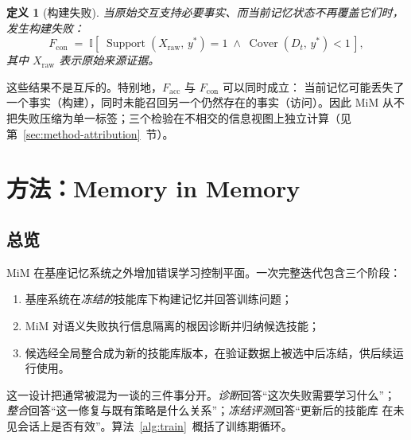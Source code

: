 \documentclass[UTF8,11pt]{ctexart}
\newtheorem{definition}{定义}[section]
\newcommand{\II}{\mathbb{I}}
\DeclareMathOperator{\Cover}{Cover}
\DeclareMathOperator{\Support}{Support}
\begin{document}
\begin{definition}[构建失败]
\label{def:con}
当原始交互支持必要事实、而当前记忆状态不再覆盖它们时，发生\emph{构建失败}：
\begin{equation}
\label{eq:fcon}
F_{\mathrm{con}} \;=\; \II\left[\; \Support(X_{\mathrm{raw}},\,y^{*}) = 1
\;\land\; \Cover(D_t,\,y^{*}) < 1 \,\right],
\end{equation}
\noindent 其中 $X_{\mathrm{raw}}$ 表示原始来源证据。
\end{definition}

这些结果不是互斥的。特别地，$F_{\mathrm{acc}}$ 与 $F_{\mathrm{con}}$ 可以同时成立：
当前记忆可能丢失了一个事实（构建），同时未能召回另一个仍然存在的事实（访问）。因此
MiM 从不把失败压缩为单一标签；三个检验在不相交的信息视图上独立计算（见
第~\ref{sec:method-attribution}~节）。

\section{方法：Memory in Memory}
\label{sec:method}

\subsection{总览}
\label{sec:method-overview}

MiM 在基座记忆系统之外增加错误学习控制平面。一次完整迭代包含三个阶段：

\begin{enumerate}[leftmargin=*,itemsep=2pt,topsep=4pt]
  \item 基座系统在\emph{冻结的}技能库下构建记忆并回答训练问题；
  \item MiM 对语义失败执行信息隔离的根因诊断并归纳候选技能；
  \item 候选经全局整合成为新的技能库版本，在验证数据上被选中后冻结，供后续运行使用。
\end{enumerate}

这一设计把通常被混为一谈的三件事分开。\emph{诊断}回答“这次失败需要学习什么”；
\emph{整合}回答“这一修复与既有策略是什么关系”；\emph{冻结评测}回答“更新后的技能库
在未见会话上是否有效”。算法~\ref{alg:train}~概括了训练期循环。
\end{document}
